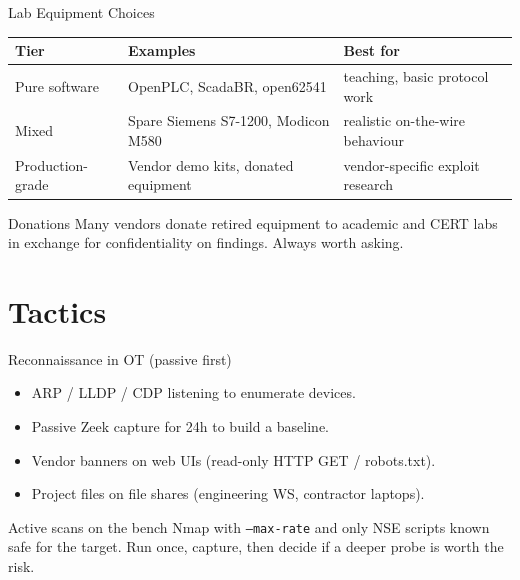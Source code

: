 \documentclass[aspectratio=169,11pt]{beamer}
\begin{document}
\begin{frame}{Lab Equipment Choices}
\centering
\renewcommand{\arraystretch}{1.3}
\footnotesize
\setlength{\tabcolsep}{3pt}
\begin{tabular}{|p{3.0cm}|p{4.8cm}|p{4.4cm}|}
\hline
\rowcolor{slidePanel}
\textbf{Tier} & \textbf{Examples} & \textbf{Best for} \\
\hline
Pure software & OpenPLC, ScadaBR, open62541   & teaching, basic protocol work \\
Mixed         & Spare Siemens S7-1200, Modicon M580 & realistic on-the-wire behaviour \\
Production-grade & Vendor demo kits, donated equipment & vendor-specific exploit research \\
\hline
\end{tabular}
\vspace{2mm}
\begin{notebox}{Donations}
Many vendors donate retired equipment to academic and CERT labs in exchange for confidentiality on findings. Always worth asking.
\end{notebox}
\end{frame}

\section{Tactics}

\begin{frame}{Reconnaissance in OT (passive first)}
\begin{itemize}
  \item ARP / LLDP / CDP listening to enumerate devices.
  \item Passive Zeek capture for 24h to build a baseline.
  \item Vendor banners on web UIs (read-only HTTP GET / robots.txt).
  \item Project files on file shares (engineering WS, contractor laptops).
\end{itemize}
\begin{warnbox}{Active scans on the bench}
Nmap with \texttt{--max-rate} and only NSE scripts known safe for the target. Run once, capture, then decide if a deeper probe is worth the risk.
\end{warnbox}
\end{frame}
\end{document}
